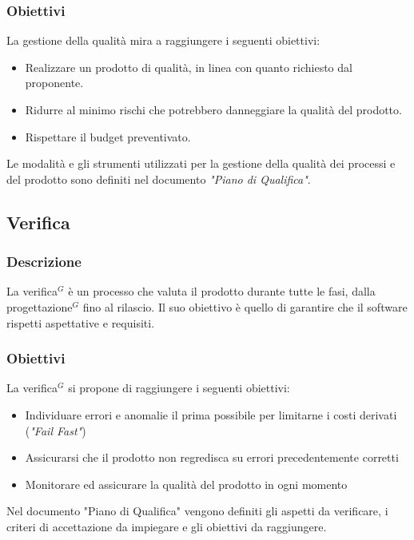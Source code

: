 \documentclass[a4paper,10pt]{article}
\begin{document}
\subsubsection{Obiettivi}
La gestione della qualità mira a raggiungere i seguenti obiettivi:
\begin{itemize}
  \item Realizzare un prodotto di qualità, in linea con quanto richiesto dal proponente. 
  \item Ridurre al minimo rischi che potrebbero danneggiare la qualità del prodotto.
  \item Rispettare il budget preventivato.
\end{itemize}
Le modalità e gli strumenti utilizzati per la gestione della qualità dei processi e del prodotto sono definiti nel documento \textit{"Piano di Qualifica"}.

\subsection{Verifica}
\subsubsection{Descrizione}
La verifica$^G$ è un processo che valuta il prodotto durante tutte le fasi, dalla progettazione$^G$ fino al rilascio.
Il suo obiettivo è quello di garantire che il software rispetti aspettative e requisiti.
\subsubsection{Obiettivi}
La verifica$^G$ si propone di raggiungere i seguenti obiettivi:
\begin{itemize}
  \item Individuare errori e anomalie il prima possibile per limitarne i costi derivati (\textit{"Fail Fast"})
  \item Assicurarsi che il prodotto non regredisca su errori precedentemente corretti
  \item Monitorare ed assicurare la qualità del prodotto in ogni momento
\end{itemize}
Nel documento "Piano di Qualifica" vengono definiti gli aspetti da verificare, i criteri di accettazione da impiegare e gli obiettivi da raggiungere.
\end{document}
